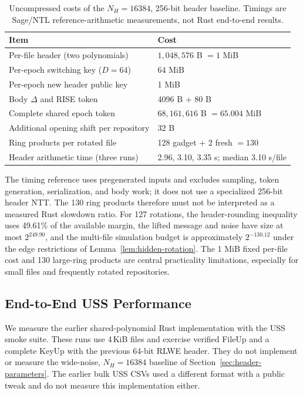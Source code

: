 \begin{table}[htbp]
\centering
\caption{Uncompressed costs of the $N_H=16384$, 256-bit header baseline. Timings are Sage/NTL reference-arithmetic measurements, not Rust end-to-end results.}
\label{tab:header-cost}
\small
\begin{tabularx}{\textwidth}{@{}>{\raggedright\arraybackslash}p{}Y@{}}
\toprule
Item & Cost \\
\midrule
Per-file header (two polynomials) & $1{,}048{,}576$ B $=1$ MiB \\
Per-epoch switching key ($D=64$) & 64 MiB \\
Per-epoch new header public key & 1 MiB \\
Body $\Delta$ and RISE token & 4096 B + 80 B \\
Complete shared epoch token & $68{,}161{,}616$ B $=65.004$ MiB \\
Additional opening shift per repository & 32 B \\
Ring products per rotated file & 128 gadget + 2 fresh $=130$ \\
Header arithmetic time (three runs) & 2.96, 3.10, 3.35 s; median 3.10 s/file \\
\bottomrule
\end{tabularx}
\end{table}

The timing reference uses pregenerated inputs and excludes sampling, token generation, serialization, and body work; it does not use a specialized 256-bit header NTT. The 130 ring products therefore must not be interpreted as a measured Rust slowdown ratio. For 127 rotations, the header-rounding inequality uses 49.61\% of the available margin, the lifted message and noise have size at most $2^{249.90}$, and the multi-file simulation budget is approximately $2^{-130.12}$ under the edge restrictions of Lemma~\ref{lem:hidden-rotation}. The 1 MiB fixed per-file cost and 130 large-ring products are central practicality limitations, especially for small files and frequently rotated repositories.

\subsection{End-to-End USS Performance}
\label{sec:eval_uss}

We measure the earlier shared-polynomial Rust implementation with the USS smoke suite. These runs use 4\,KiB files and exercise verified FileUp and a complete KeyUp with the previous 64-bit RLWE header. They do not implement or measure the wide-noise, $N_H=16384$ baseline of Section~\ref{sec:header-parameters}. The earlier bulk USS CSVs used a different format with a public tweak and do not measure this implementation either.

